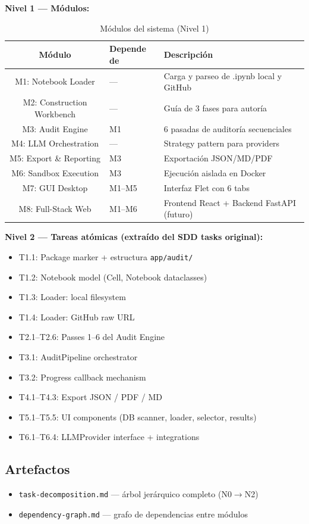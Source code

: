 \documentclass[12pt,a4paper]{article}
\begin{document}
\textbf{Nivel 1 --- Módulos:}
\begin{table}[h]
\centering
\begin{tabular}{cll}
\toprule
\textbf{Módulo} & \textbf{Depende de} & \textbf{Descripción} \\
\midrule
M1: Notebook Loader        & --- & Carga y parseo de .ipynb local y GitHub \\
M2: Construction Workbench & --- & Guía de 3 fases para autoría \\
M3: Audit Engine           & M1  & 6 pasadas de auditoría secuenciales \\
M4: LLM Orchestration      & --- & Strategy pattern para providers \\
M5: Export \& Reporting    & M3  & Exportación JSON/MD/PDF \\
M6: Sandbox Execution      & M3  & Ejecución aislada en Docker \\
M7: GUI Desktop            & M1--M5 & Interfaz Flet con 6 tabs \\
M8: Full-Stack Web         & M1--M6 & Frontend React + Backend FastAPI (futuro) \\
\bottomrule
\end{tabular}
\caption{Módulos del sistema (Nivel 1)}
\end{table}

\textbf{Nivel 2 --- Tareas atómicas (extraído del SDD tasks original):}
\begin{itemize}
  \item T1.1: Package marker + estructura \texttt{app/audit/}
  \item T1.2: Notebook model (Cell, Notebook dataclasses)
  \item T1.3: Loader: local filesystem
  \item T1.4: Loader: GitHub raw URL
  \item T2.1--T2.6: Passes 1--6 del Audit Engine
  \item T3.1: AuditPipeline orchestrator
  \item T3.2: Progress callback mechanism
  \item T4.1--T4.3: Export JSON / PDF / MD
  \item T5.1--T5.5: UI components (DB scanner, loader, selector, results)
  \item T6.1--T6.4: LLMProvider interface + integrations
\end{itemize}

\subsection*{Artefactos}
\begin{itemize}
  \item \texttt{task-decomposition.md} --- árbol jerárquico completo (N0$\rightarrow$N2)
  \item \texttt{dependency-graph.md} --- grafo de dependencias entre módulos
\end{itemize}
\end{document}
